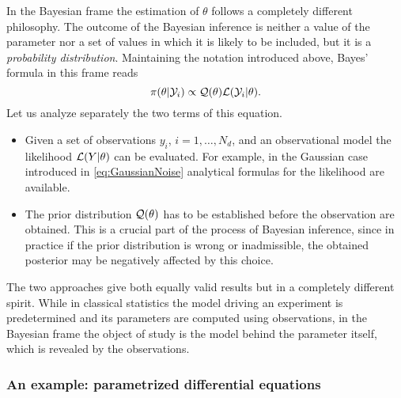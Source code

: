 In the Bayesian frame the estimation of $\theta$ follows a completely different philosophy. The outcome of the Bayesian inference is neither a value of the parameter nor a set of values in which it is likely to be  included, but it is a \textit{probability distribution}. Maintaining the notation introduced above, Bayes' formula in this frame reads
\begin{equation}
	\pi(\theta|\mathcal{Y}_i) \propto \mathcal{Q}(\theta) \mathcal{L}(\mathcal{Y}_i|\theta).
\end{equation}
Let us analyze separately the two terms of this equation.
\begin{itemize}
	\item Given a set of observations $y_i$, $i = 1, \ldots, N_d$, and an observational model the likelihood $\mathcal{L}(Y|\theta)$ can be evaluated. For example, in the Gaussian case introduced in \eqref{eq:GaussianNoise} analytical formulas for the likelihood are available.
	\item The prior distribution $\mathcal{Q}(\theta)$ has to be established before the observation are obtained. This is a crucial part of the process of Bayesian inference, since in practice if the prior distribution is wrong or inadmissible, the obtained posterior may be negatively affected by this choice.
\end{itemize}
The two approaches give both equally valid results but in a completely different spirit. While in classical statistics the model driving an experiment is predetermined and its parameters are computed using observations, in the Bayesian frame the object of study is the model behind the parameter itself, which is revealed by the observations.

\subsubsection{An example: parametrized differential equations}\label{sect:exBayes}

